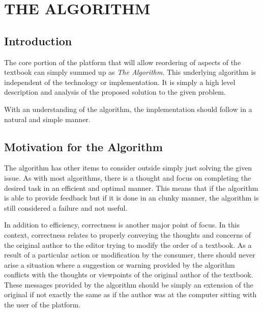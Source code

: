 %
%
%
%

\chapter{THE ALGORITHM}


\section{Introduction}

The core portion of the platform that will allow reordering of aspects of the textbook can simply summed up as \textit{The Algorithm}. This underlying algorithm is independent of the technology or implementation. It is simply a high level description and analysis of the proposed solution to the given problem.

With an understanding of the algorithm, the implementation should follow in a natural and simple manner.

\section{Motivation for the Algorithm}

The algorithm has other items to consider outside simply just solving the given issue. As with most algorithms, there is a thought and focus on completing the desired task in an efficient and optimal manner. This means that if the algorithm is able to provide feedback but if it is done in an clunky manner, the algorithm is still considered a failure and not useful.

In addition to efficiency, correctness is another major point of focus. In this context, correctness relates to properly conveying the thoughts and concerns of the original author to the editor trying to modify the order of a textbook. As a result of a particular action or modification by the consumer, there should never arise a situation where a suggestion or warning provided by the algorithm conflicts with the thoughts or viewpoints of the original author of the textbook. These messages provided by the algorithm should be simply an extension of the original if not exactly the same as if the author was at the computer sitting with the user of the platform.

